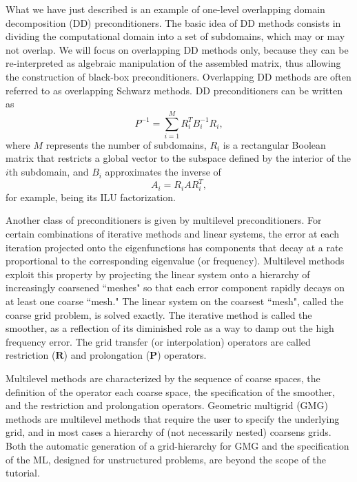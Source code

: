 \documentclass[10pt,relax]{SANDreport}
\begin{document}
What we have just described is an example of one-level overlapping domain
decomposition (DD) preconditioners.  The basic idea of DD methods consists in
dividing the computational domain into a set of subdomains, which may or may
not overlap. We will focus on overlapping DD methods only, because they can be
re-interpreted as algebraic manipulation of the assembled matrix, thus
allowing the construction of black-box preconditioners. Overlapping DD methods
are often referred to as overlapping Schwarz methods. DD preconditioners can
be written as
\begin{equation}
  \label{eq:prec_dd}
  P^{-1} = \sum_{i=1}^M R_i^T B_i^{-1} R_i,
\end{equation}
where $M$ represents the number of subdomains,
$R_i$ is a rectangular Boolean matrix that restricts
a global vector to the subspace defined by the interior of the $i$th
subdomain, and $B_i$ approximates the inverse of 
\begin{equation}
  \label{eq:aztecoo_tilde_a}
  A_i = R_i A R_i^T ,
\end{equation}
for example, being its ILU factorization.

\medskip

Another class of preconditioners is given by multilevel preconditioners.
For certain combinations of iterative methods and linear systems, the
error at each iteration projected onto the eigenfunctions has components
that decay at a rate proportional to the corresponding eigenvalue (or
frequency).  Multilevel methods exploit this property \cite{Briggs2000}
by projecting the linear system onto a hierarchy of increasingly
coarsened ``meshes" so that each error component rapidly decays on at
least one coarse ``mesh."  The linear system on the coarsest ``mesh",
called the coarse grid problem, is solved exactly.  The iterative method
is called the smoother, as a reflection of its diminished role as a way
to damp out the high frequency error.  The grid transfer (or
interpolation) operators are called restriction ($\mathbf{R}$) and
prolongation ($\mathbf{P}$) operators.

Multilevel methods are characterized by the sequence of coarse spaces, the
definition of the operator each coarse space, the specification of the
smoother, and the restriction and prolongation operators.  Geometric multigrid
(GMG) methods  are multilevel methods that require the user to specify the
underlying grid, and in most cases a hierarchy of (not necessarily nested)
  coarsens grids.  Both the automatic generation of a grid-hierarchy for GMG
  and the specification of the ML, designed for unstructured problems, are
  beyond the scope of the tutorial.
\end{document}
